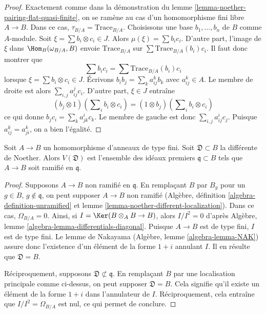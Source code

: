 \begin{proof}
Exactement comme dans la démonstration du lemme \ref{lemma-noether-pairing-flat-quasi-finite},
on se ramène au cas d'un homomorphisme fini libre $A \to B$.
Dans ce cas, $\tau_{B/A} = \text{Trace}_{B/A}$.
Choisissons une base $b_1, \ldots, b_n$ de $B$ comme $A$-module.
Soit $\xi = \sum b_i \otimes c_i \in J$. Alors $\mu(\xi) = \sum b_i c_i$.
D'autre part, l'image de $\xi$ dans $\Hom_B(\omega_{B/A}, B)$
envoie $\text{Trace}_{B/A}$ sur $\sum \text{Trace}_{B/A}(b_i)c_i$.
Il faut donc montrer que
$$
\sum b_ic_i = \sum \text{Trace}_{B/A}(b_i)c_i
$$
lorsque $\xi = \sum b_i \otimes c_i \in J$. Écrivons $b_i b_j = \sum_k a_{ij}^k b_k$
avec $a_{ij}^k \in A$. Le membre de droite est alors
$\sum_{i, j} a_{ij}^j c_i$. D'autre part, $\xi \in J$ entraîne
$$
(b_j \otimes 1)(\sum\nolimits_i b_i \otimes c_i) =
(1 \otimes b_j)(\sum\nolimits_i b_i \otimes c_i)
$$
ce qui donne $b_j c_i = \sum_k a_{jk}^i c_k$. Le membre de gauche
est donc $\sum_{i, j} a_{ij}^i c_j$. Puisque $a_{ij}^k = a_{ji}^k$, on a bien l'égalité.
\end{proof}

\begin{lemma}
\label{lemma-noether-different}
Soit $A \to B$ un homomorphisme d'anneaux de type fini. Soit $\mathfrak{D} \subset B$
la différente de Noether. Alors $V(\mathfrak{D})$ est l'ensemble des idéaux premiers
$\mathfrak q \subset B$ tels que $A \to B$ soit ramifié en $\mathfrak q$.
\end{lemma}

\begin{proof}
Supposons $A \to B$ non ramifié en $\mathfrak q$. En remplaçant
$B$ par $B_g$ pour un $g \in B$, $g \not \in \mathfrak q$, on peut
supposer $A \to B$ non ramifié (Algèbre, définition
\ref{algebra-definition-unramified} et
lemme \ref{lemma-noether-different-localization}).
Dans ce cas, $\Omega_{B/A} = 0$. Ainsi, si $I = \Ker(B \otimes_A B \to B)$,
alors $I/I^2 = 0$ d'après
Algèbre, lemme \ref{algebra-lemma-differentials-diagonal}.
Puisque $A \to B$ est de type fini, $I$ est de type
fini. Le lemme de Nakayama
(Algèbre, lemme \ref{algebra-lemma-NAK})
assure donc l'existence d'un élément de la forme $1 + i$
annulant $I$. Il en résulte que $\mathfrak{D} = B$.

\medskip\noindent
Réciproquement, supposons $\mathfrak{D} \not \subset \mathfrak q$.
En remplaçant $B$ par une localisation principale comme ci-dessus,
on peut supposer $\mathfrak{D} = B$. Cela signifie qu'il existe un
élément de la forme $1 + i$ dans l'annulateur de $I$.
Réciproquement, cela entraîne que $I/I^2 = \Omega_{B/A}$ est nul,
ce qui permet de conclure.
\end{proof}







